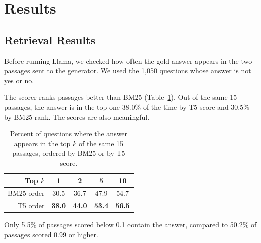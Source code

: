 \documentclass[11pt,twocolumn]{article}
\begin{document}
\section{Results}

\subsection{Retrieval Results}
\label{sec:retrieval_results}

Before running Llama, we checked how often the gold answer appears in the two passages sent to the generator. We used the 1,050 questions whose answer is not yes or no.

The scorer ranks passages better than BM25 (Table~\ref{tab:rerank}). Out of the same 15 passages, the answer is in the top one 38.0\% of the time by T5 score and 30.5\% by BM25 rank. The scores are also meaningful.

\begin{table}[t]
\centering
\small
\begin{tabular}{rcccc}
\toprule
Top $k$ & 1 & 2 & 5 & 10 \\
\midrule
BM25 order & 30.5 & 36.7 & 47.9 & 54.7 \\
T5 order & \textbf{38.0} & \textbf{44.0} & \textbf{53.4} & \textbf{56.5} \\
\bottomrule
\end{tabular}
\caption{Percent of questions where the answer appears in the top $k$ of the same 15 passages, ordered by BM25 or by T5 score.}
\label{tab:rerank}
\end{table}
 Only 5.5\% of passages scored below 0.1 contain the answer, compared to 50.2\% of passages scored 0.99 or higher.

\begin{table}[t]
\centering
\small
{}
\caption{Threshold sweep with a cap of 15. ``Gold in selected'' is the percent of questions where the answer appears in the two passages passed to Llama.}
\label{tab:sweep}
\end{table}
\end{document}
